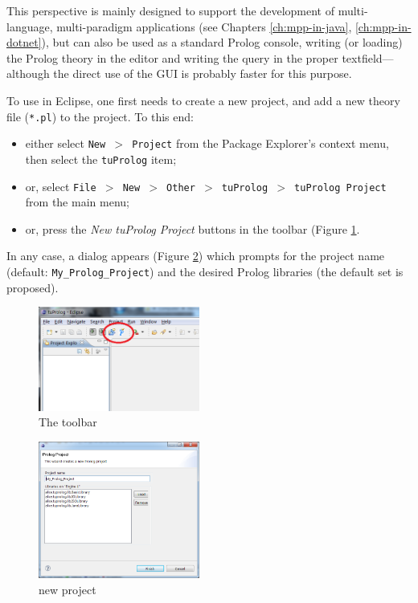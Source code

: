 This perspective is mainly designed to support the development of multi-language, multi-paradigm applications (see Chapters \ref{ch:mpp-in-java}, \ref{ch:mpp-in-dotnet}), but can also be used as a standard Prolog console, writing (or loading) the Prolog theory in the editor and writing the query in the proper textfield---although the direct use of the \tuprolog{} GUI is probably faster for this purpose.

To use \tuprolog{} in Eclipse, one first needs to create a new \tuprolog{} project, and add a new theory file (\texttt{*.pl}) to the project.
%
To this end:%
\begin{itemize}
  \item either select \texttt{New $>$ Project} from the Package Explorer's context menu, then select the \texttt{tuProlog} item;
  \item or, select \texttt{File $>$ New $>$ Other $>$ tuProlog $>$ tuProlog Project} from the main menu;
  \item or, press the \textit{New tuProlog Project} buttons in the \tuprolog{} toolbar (Figure \ref{fig:plugin1}.
\end{itemize}

In any case, a dialog appears (Figure \ref{fig:plugin2}) which prompts for the project name (default: \texttt{My\_Prolog\_Project}) and the desired Prolog libraries (the default set is proposed).

\begin{figure}
  \includegraphics[width=200px]{images/plugin1.png}
  \caption{The \tuprolog{} toolbar}\label{fig:plugin1}
\end{figure}

\begin{figure}
  \includegraphics[width=200px]{images/plugin2.png}
  \caption{new \tuprolog{} project}\label{fig:plugin2}
\end{figure}

